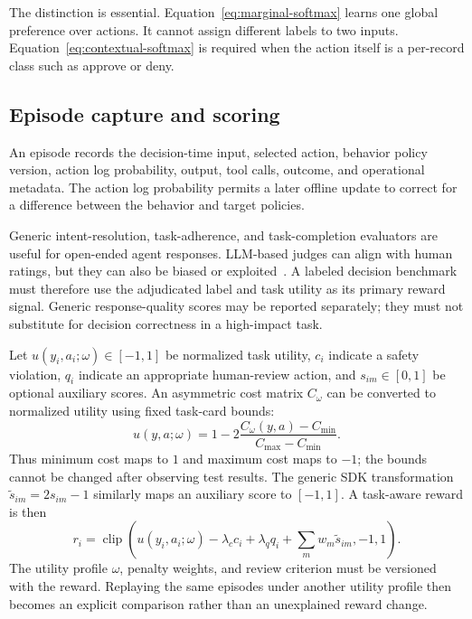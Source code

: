 \documentclass[conference]{IEEEtran}
\begin{document}
The distinction is essential. Equation~\ref{eq:marginal-softmax}
learns one global preference over actions. It cannot assign different
labels to two inputs. Equation~\ref{eq:contextual-softmax} is required
when the action itself is a per-record class such as approve or deny.

\subsection{Episode capture and scoring}

An episode records the decision-time input, selected action, behavior
policy version, action log probability, output, tool calls, outcome,
and operational metadata. The action log probability permits a later
offline update to correct for a difference between the behavior and
target policies.

Generic intent-resolution, task-adherence, and task-completion
evaluators are useful for open-ended agent responses. LLM-based
judges can align with human ratings, but they can also be biased or
exploited~\cite{zheng2023judging,liu2023geval,skalse2022reward,
pan2022reward}. A labeled decision benchmark must therefore use the
adjudicated label and task utility as its primary reward signal.
Generic response-quality scores may be reported separately; they
must not substitute for decision correctness in a high-impact task.

Let $u(y_i,a_i;\omega)\in[-1,1]$ be normalized task utility,
$c_i$ indicate a safety violation, $q_i$ indicate an appropriate
human-review action, and $s_{im}\in[0,1]$ be optional auxiliary
scores. An asymmetric cost matrix $C_\omega$ can be converted to
normalized utility using fixed task-card bounds:
\begin{equation}
u(y,a;\omega)=1-2\frac{C_\omega(y,a)-C_{\min}}
{C_{\max}-C_{\min}}.
\label{eq:utility-normalization}
\end{equation}
Thus minimum cost maps to $1$ and maximum cost maps to $-1$; the
bounds cannot be changed after observing test results. The generic
SDK transformation $\widetilde{s}_{im}=2s_{im}-1$ similarly maps an
auxiliary score to $[-1,1]$. A task-aware reward is then
\begin{equation}
r_i = \operatorname{clip}\!\left(
u(y_i,a_i;\omega)
-\lambda_c c_i + \lambda_q q_i
+\sum_m w_m\widetilde{s}_{im}, -1, 1\right).
\label{eq:reward}
\end{equation}
The utility profile $\omega$, penalty weights, and review criterion
must be versioned with the reward. Replaying the same episodes under
another utility profile then becomes an explicit comparison rather
than an unexplained reward change.
\end{document}
